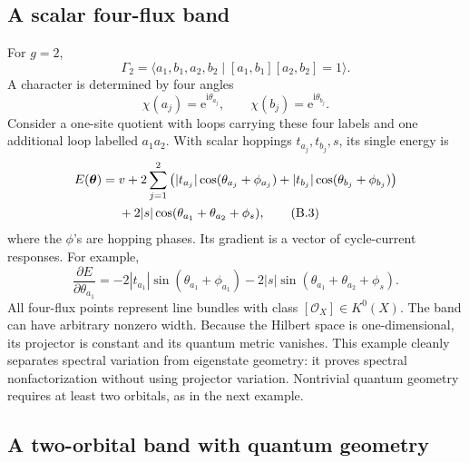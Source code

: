 \documentclass[11pt]{article}
\theoremstyle{definition}
\theoremstyle{remark}
\newcommand{\cO}{\mathcal O}
\newcommand{\ii}{\mathrm i}
\newcommand{\e}{\mathrm e}
\begin{document}
\subsection{A scalar four-flux band}

For \(g=2\),
\[
 \Gamma_2=
 \langle a_1,b_1,a_2,b_2\mid[a_1,b_1][a_2,b_2]=1\rangle.
 \tag{B.1}\label{eq:genus-two-group}
\]
A character is determined by four angles
\[
 \chi(a_j)=\e^{\ii\theta_{a_j}},
 \qquad
 \chi(b_j)=\e^{\ii\theta_{b_j}}.
 \tag{B.2}\label{eq:four-fluxes}
\]
Consider a one-site quotient with loops carrying these four labels and one
additional loop labelled \(a_1a_2\).  With scalar hoppings
\(t_{a_j},t_{b_j},s\), its single energy is
\begin{align}
E(\bm\theta)
={}&v
+2\sum_{j=1}^2
  \left(
    |t_{a_j}|\cos(\theta_{a_j}+\phi_{a_j})
   +|t_{b_j}|\cos(\theta_{b_j}+\phi_{b_j})
  \right)\notag\\
&+2|s|\cos(\theta_{a_1}+\theta_{a_2}+\phi_s),
\tag{B.3}\label{eq:genus-two-scalar}
\end{align}
where the \(\phi\)'s are hopping phases.  Its gradient is a vector of
cycle-current responses.  For example,
\[
 \frac{\partial E}{\partial\theta_{a_1}}
 =-2|t_{a_1}|\sin(\theta_{a_1}+\phi_{a_1})
  -2|s|\sin(\theta_{a_1}+\theta_{a_2}+\phi_s).
 \tag{B.4}\label{eq:genus-two-velocity}
\]
All four-flux points represent line bundles with class
\([\cO_X]\in K^0(X)\).  The band can have arbitrary nonzero width.  Because
the Hilbert space is one-dimensional, its projector is constant and its
quantum metric vanishes.  This example cleanly separates spectral variation
from eigenstate geometry: it proves spectral nonfactorization without using
projector variation.  Nontrivial quantum geometry requires at least two
orbitals, as in the next example.

\subsection{A two-orbital band with quantum geometry}
\end{document}
